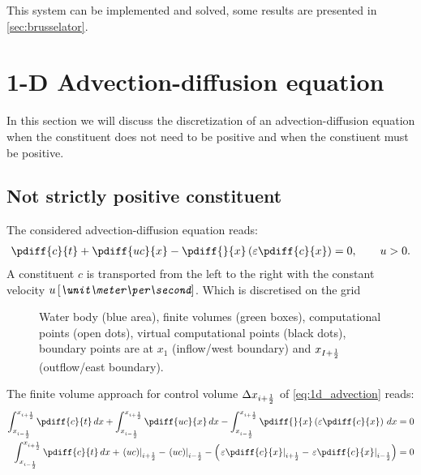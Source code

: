This system can be implemented and solved, some results are presented in \autoref{sec:brusselator}.
%
\section{1-D Advection-diffusion equation}
In this section we will discuss the discretization of an advection-diffusion equation when the constituent does not need to be positive and when the constiuent must be positive.

\subsection{Not strictly positive constituent}\label{sec:1d_adv_diff_equation}
The considered advection-diffusion equation reads:
\begin{align}
    \pdiff{c}{t} + \pdiff{uc}{x} - \pdiff{}{x}\left( \eps \pdiff{c}{x}\right)= 0, \qquad u>0. \label{eq:1d_advection}
\end{align}
A constituent $c$ is transported from the left to the right with the constant  velocity $u\, \bunit{\meter\per\second}$.
Which is discretised on the grid
\begin{figure}[H]
    \centering
    \begin{center}
        \resizebox{0.8\textwidth}{!}{
            
        }
    \end{center}
    \caption[Definition of the grid to solve the 1D-advection equation]{Water body (blue area), finite volumes (green boxes), computational points (open dots), virtual computational points (black dots), boundary points are at $x_{1}$ (inflow/west boundary) and $x_{I+\frac{1}{2}}$ (outflow/east boundary).}\label{fig:water_body_fve_bc_at_node_1}
\end{figure}
The finite volume approach for control volume $\Delta x_{i+\frac{1}{2}}$ of \autoref{eq:1d_advection} reads:
\begin{align}
    \int^{x_{i+\half}}_{x_{i-\half}} \pdiff{c}{t}\, dx
    + \int^{x_{i+\half}}_{x_{i-\half}} \pdiff{uc}{x} \, dx
    - \int^{x_{i+\half}}_{x_{i-\half}} \pdiff{}{x}\left( \eps\pdiff{c}{x} \right)\, dx &= 0
    \\
    \int^{x_{i+\half}}_{x_{i-\half}} \pdiff{c}{t}\, dx + \left. (uc) \right|_{i+\half} -  \left. (uc) \right|_{i-\half}
    -  \left(
    \left. \eps\pdiff{c}{x}\right|_{i+\half} -
    \left. \eps\pdiff{c}{x}\right|_{i-\half}
     \right) & = 0
\end{align}

